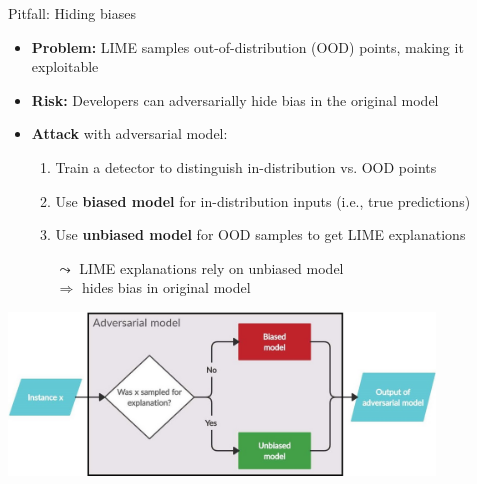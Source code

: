 \documentclass[10pt,compress,t,notes=noshow, xcolor=table]{beamer}
\begin{document}
\begin{frame}{Pitfall: Hiding biases }

\begin{itemize}
      \item \textbf{Problem:} LIME samples out-of-distribution (OOD) points, making it exploitable
  \item \textbf{Risk:} Developers can adversarially hide bias in the original model
	\pause
	\item \textbf{Attack} with adversarial model:
	    \begin{enumerate}
	    \item Train a detector to distinguish in-distribution vs. OOD points
        \item Use \textbf{biased model} for in-distribution inputs (i.e., true predictions)
        \item Use \textbf{unbiased model} for OOD samples to get LIME explanations
        \item[$\leadsto$] LIME explanations rely on unbiased model \\$\Rightarrow$ hides bias in original model 
	    \end{enumerate}
\end{itemize}
	    \centering
	    \includegraphics[width=0.85\textwidth]{figure/attack_biased_unbiased.jpg}\\

\end{frame}
\end{document}

